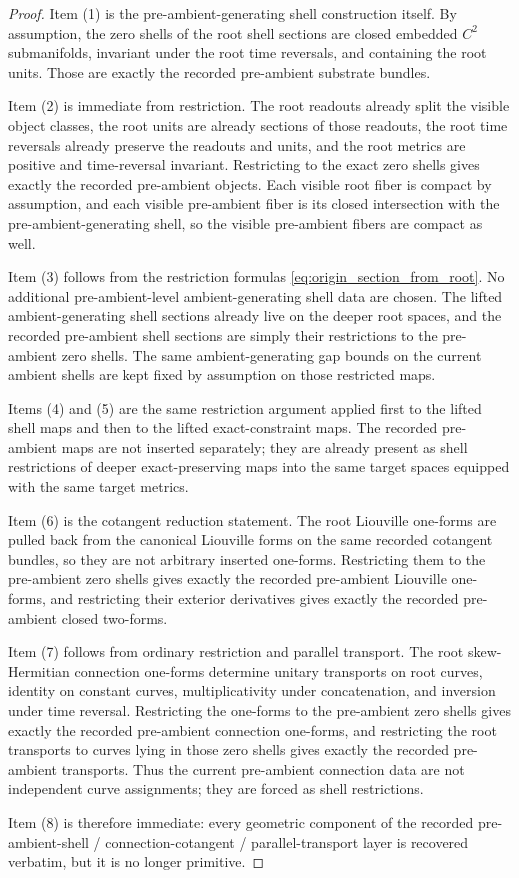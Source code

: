 \documentclass[11pt]{article}
\begin{document}
\begin{proof}
Item (1) is the pre-ambient-generating shell construction itself. By assumption, the zero shells of the root shell sections are closed embedded \(C^2\) submanifolds, invariant under the root time reversals, and containing the root units. Those are exactly the recorded pre-ambient substrate bundles.

Item (2) is immediate from restriction. The root readouts already split the visible object classes, the root units are already sections of those readouts, the root time reversals already preserve the readouts and units, and the root metrics are positive and time-reversal invariant. Restricting to the exact zero shells gives exactly the recorded pre-ambient objects. Each visible root fiber is compact by assumption, and each visible pre-ambient fiber is its closed intersection with the pre-ambient-generating shell, so the visible pre-ambient fibers are compact as well.

Item (3) follows from the restriction formulas \eqref{eq:origin_section_from_root}. No additional pre-ambient-level ambient-generating shell data are chosen. The lifted ambient-generating shell sections already live on the deeper root spaces, and the recorded pre-ambient shell sections are simply their restrictions to the pre-ambient zero shells. The same ambient-generating gap bounds on the current ambient shells are kept fixed by assumption on those restricted maps.

Items (4) and (5) are the same restriction argument applied first to the lifted shell maps and then to the lifted exact-constraint maps. The recorded pre-ambient maps are not inserted separately; they are already present as shell restrictions of deeper exact-preserving maps into the same target spaces equipped with the same target metrics.

Item (6) is the cotangent reduction statement. The root Liouville one-forms are pulled back from the canonical Liouville forms on the same recorded cotangent bundles, so they are not arbitrary inserted one-forms. Restricting them to the pre-ambient zero shells gives exactly the recorded pre-ambient Liouville one-forms, and restricting their exterior derivatives gives exactly the recorded pre-ambient closed two-forms.

Item (7) follows from ordinary restriction and parallel transport. The root skew-Hermitian connection one-forms determine unitary transports on root curves, identity on constant curves, multiplicativity under concatenation, and inversion under time reversal. Restricting the one-forms to the pre-ambient zero shells gives exactly the recorded pre-ambient connection one-forms, and restricting the root transports to curves lying in those zero shells gives exactly the recorded pre-ambient transports. Thus the current pre-ambient connection data are not independent curve assignments; they are forced as shell restrictions.

Item (8) is therefore immediate: every geometric component of the recorded pre-ambient-shell / connection-cotangent / parallel-transport layer is recovered verbatim, but it is no longer primitive.
\end{proof}
\end{document}
